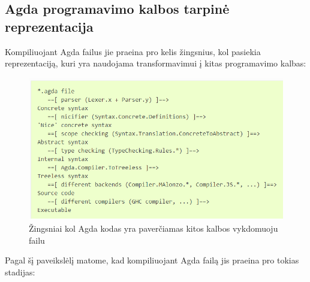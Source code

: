 \documentclass{VUMIFPSbakalaurinis}
\begin{document}
\subsection{Agda programavimo kalbos tarpinė reprezentacija}
Kompiliuojant Agda failus jie praeina pro kelis žingsnius, kol pasiekia reprezentaciją, kuri yra naudojama transformavimui į kitas programavimo kalbas:
\begin{figure}[H]
	\centering
	\includegraphics{agdaFileCompilation.png}
	\caption{Žingsniai kol Agda kodas yra paverčiamas kitos kalbos vykdomuoju failu \cite{AgdaWeb}}
	\centering
	\end{figure}
Pagal šį paveikslėlį matome, kad kompiliuojant Agda failą jis praeina pro tokias stadijas: 
\end{document}
